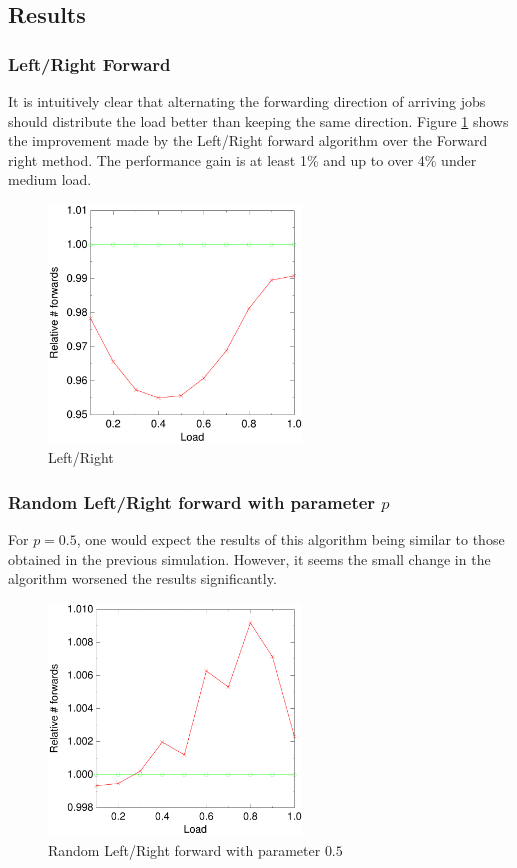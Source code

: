 \documentclass[10pt,a4paper,titlepage]{article}
\begin{document}
\subsection{Results}

\subsubsection*{Left/Right Forward}
It is intuitively clear that alternating the forwarding direction of arriving jobs should distribute the load better than keeping the same direction. Figure \ref{figlr} shows the improvement made by the Left/Right forward algorithm over the Forward right method. The performance gain is at least 1\% and up to over 4\% under medium load.

\begin{figure}[h!tb]
\centering
\includegraphics[width=0.6\textwidth]{data/switchright.pdf}
\caption{Left/Right}
\label{figlr}
\end{figure}


\subsubsection*{Random Left/Right forward with parameter $p$}
For $p=0.5$, one would expect the results of this algorithm being similar to those obtained in the previous simulation. However, it seems the small change in the algorithm worsened the results significantly.

\begin{figure}[h!tb]
\centering
\includegraphics[width=0.6\textwidth]{data/randswitchright.pdf}
\caption{Random Left/Right forward with parameter $0.5$}
\label{figrandswitch}
\end{figure}
\end{document}
